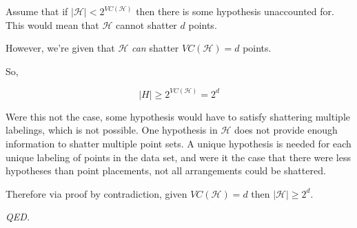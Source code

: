 \documentclass{article}
\begin{document}
\begin{enumerate}
        Assume that if $|\mathcal{H}| < 2^{VC(\mathcal{H})}$ then there is some hypothesis unaccounted for. This would mean that $\mathcal{H}$ cannot shatter $d$ points. 
        
        However, we're given that $\mathcal{H}$ \textit{can} shatter $VC(\mathcal{H}) = d$ points. 
        
        So, 
        
        \begin{equation*}
            |H| \geq 2^{VC(\mathcal{H})} = 2^d 
        \end{equation*}
        
        Were this not the case, some hypothesis would have to satisfy shattering multiple labelings, which is not possible. One hypothesis in $\mathcal{H}$ does not provide enough information to shatter multiple point sets. A unique hypothesis is needed for each unique labeling of points in the data set, and were it the case that there were less hypotheses than point placements, not all arrangements could be shattered. 
        
        Therefore via proof by contradiction, given $VC(\mathcal{H}) = d$ then $|\mathcal{H}| \geq 2^d$.
        
        \textit{QED.}
\end{enumerate}

        
\end{document}
